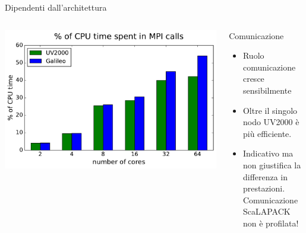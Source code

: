 \documentclass[8pt]{beamer}
\begin{document}
\begin{frame}{Dipendenti dall'architettura}
\begin{columns}
		\begin{center}			
			\vspace{-1cm}
			\includegraphics[width=1\textwidth]{arch_mpi_perc.pdf}			
		\end{center}
		\begin{overlayarea}{\linewidth}{\textheight}
		\begin{block}{Comunicazione}
			\begin{itemize}
				\item<1-> Ruolo comunicazione cresce sensibilmente
				\item<2-> Oltre il singolo nodo UV2000 \`e pi\`u efficiente.
				\item<3-> Indicativo ma non giustifica la differenza in prestazioni.\\Comunicazione ScaLAPACK non \`e profilata!
			\end{itemize}		
		\end{block}

		\end{overlayarea}
\end{columns}

\end{frame}
\end{document}
